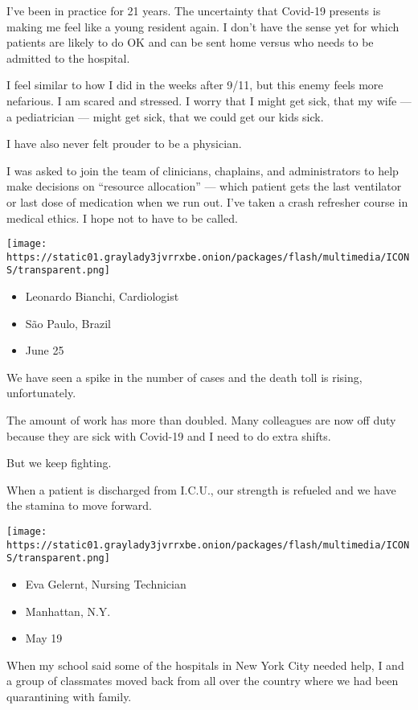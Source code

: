 I've been in practice for 21 years. The uncertainty that Covid-19
presents is making me feel like a young resident again. I don't have the
sense yet for which patients are likely to do OK and can be sent home
versus who needs to be admitted to the hospital.

I feel similar to how I did in the weeks after 9/11, but this enemy
feels more nefarious. I am scared and stressed. I worry that I might get
sick, that my wife --- a pediatrician --- might get sick, that we could
get our kids sick.

I have also never felt prouder to be a physician.

I was asked to join the team of clinicians, chaplains, and
administrators to help make decisions on ``resource allocation'' ---
which patient gets the last ventilator or last dose of medication when
we run out. I've taken a crash refresher course in medical ethics. I
hope not to have to be called.

\texttt{[image: https://static01.graylady3jvrrxbe.onion/packages/flash/multimedia/ICONS/transparent.png]}

\begin{itemize}
\tightlist
\item
  Leonardo Bianchi, Cardiologist
\item
  São Paulo, Brazil
\item
  June 25
\end{itemize}

We have seen a spike in the number of cases and the death toll is
rising, unfortunately.

The amount of work has more than doubled. Many colleagues are now off
duty because they are sick with Covid-19 and I need to do extra shifts.

But we keep fighting.

When a patient is discharged from I.C.U., our strength is refueled and
we have the stamina to move forward.

\texttt{[image: https://static01.graylady3jvrrxbe.onion/packages/flash/multimedia/ICONS/transparent.png]}

\begin{itemize}
\tightlist
\item
  Eva Gelernt, Nursing Technician
\item
  Manhattan, N.Y.
\item
  May 19
\end{itemize}

When my school said some of the hospitals in New York City needed help,
I and a group of classmates moved back from all over the country where
we had been quarantining with family.

